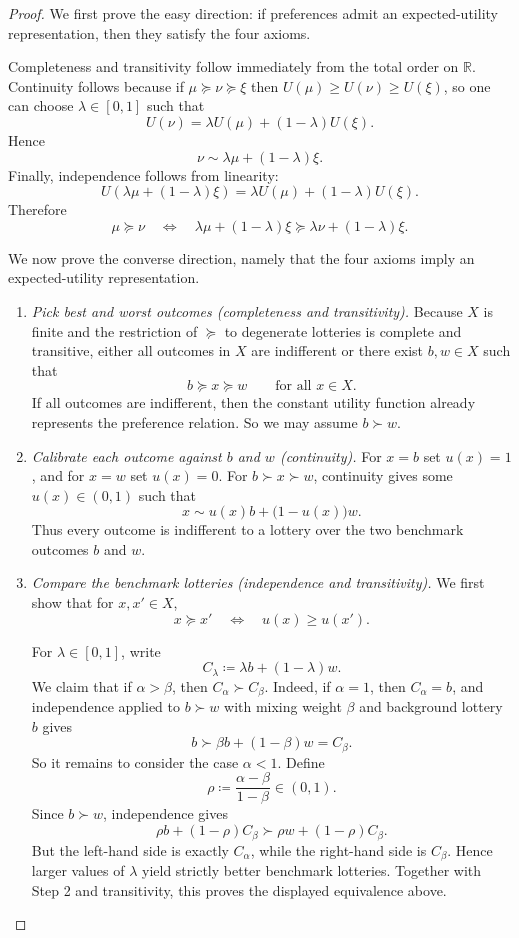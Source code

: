 \documentclass[11pt]{article}
\newcommand{\R}{\mathbb{R}}
\newcommand{\pref}{\succcurlyeq}
\newcommand{\strictpref}{\succ}
\newcommand{\indiff}{\sim}
\begin{document}
\begin{proof}
We first prove the easy direction: if preferences admit an expected-utility
representation, then they satisfy the four axioms.

Completeness and transitivity follow immediately from the total order on
$\R$. Continuity follows because if $\mu\pref\nu\pref\xi$ then 
$U(\mu)\geq U(\nu)\geq U(\xi)$, so one can choose $\lambda\in[0,1]$ such that
\[
U(\nu)=\lambda U(\mu)+(1-\lambda)U(\xi).
\]
Hence
\[
\nu \indiff \lambda \mu +(1-\lambda)\xi.
\]
Finally, independence follows from linearity:
\[
U(\lambda \mu +(1-\lambda)\xi)
=
\lambda U(\mu)+(1-\lambda)U(\xi).
\]
Therefore
\[
\mu\pref\nu
\quad\Longleftrightarrow\quad
\lambda \mu +(1-\lambda)\xi \pref \lambda \nu +(1-\lambda)\xi.
\]

We now prove the converse direction, namely that the four axioms imply an
expected-utility representation.

\begin{enumerate}[label=\textbf{\arabic*.}, leftmargin=*]
\item \emph{Pick best and worst outcomes (completeness and transitivity).}
Because $X$ is finite and the restriction of $\pref$ to degenerate lotteries is
complete and transitive, either all outcomes in $X$ are indifferent or there
exist $b,w\in X$ such that
\[
b\pref x \pref w
\qquad
\text{for all } x\in X.
\]
If all outcomes are indifferent, then the constant utility function already
represents the preference relation. So we may assume $b\strictpref w$.

\item \emph{Calibrate each outcome against $b$ and $w$ (continuity).}
For $x=b$ set $u(x)=1$, and for $x=w$ set $u(x)=0$. For
$b\strictpref x \strictpref w$, continuity gives some $u(x)\in(0,1)$ such that
\[
x \indiff u(x)b+\big(1-u(x)\big)w.
\]
Thus every outcome is indifferent to a lottery over the two benchmark outcomes
$b$ and $w$.

\item \emph{Compare the benchmark lotteries (independence and transitivity).}
We first show that for $x,x'\in X$,
\[
x\pref x'
\quad\Longleftrightarrow\quad
u(x)\geq u(x').
\]

For $\lambda\in[0,1]$, write
\[
C_\lambda \coloneqq \lambda b +(1-\lambda)w.
\]
We claim that if $\alpha>\beta$, then $C_\alpha \strictpref C_\beta$. Indeed,
if $\alpha=1$, then $C_\alpha=b$, and independence applied to
$b\strictpref w$ with mixing weight $\beta$ and background lottery $b$ gives
\[
b \strictpref \beta b +(1-\beta)w = C_\beta.
\]
So it remains to consider the case $\alpha<1$. Define
\[
\rho \coloneqq \frac{\alpha-\beta}{1-\beta}\in(0,1).
\]
Since $b\strictpref w$, independence gives
\[
\rho b +(1-\rho)C_\beta
\strictpref
\rho w +(1-\rho)C_\beta.
\]
But the left-hand side is exactly $C_\alpha$, while the right-hand side is
$C_\beta$. Hence larger values of $\lambda$ yield strictly better benchmark
lotteries. Together with Step 2 and transitivity, this proves the displayed
equivalence above.


\end{enumerate}
\end{proof}
\end{document}
